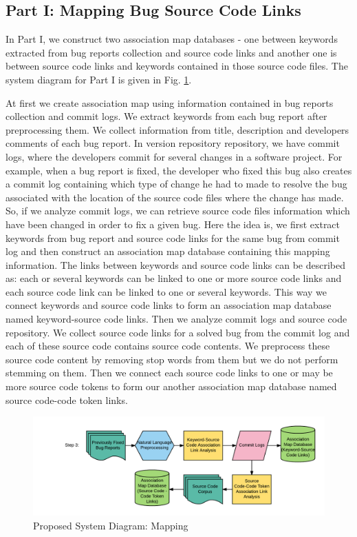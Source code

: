 \documentclass{sig-alternate}
\begin{document}
\subsection{Part I: Mapping Bug Source Code Links}
In Part I, we construct two association map databases -  one between keywords extracted from bug reports collection and source code links and another one is between source code links and keywords contained in those source code files. The system diagram for Part I is given in Fig. \ref{fig:MP}.

At first we create association map using information contained in bug reports collection and commit logs. We extract keywords from each bug report after preprocessing them. We collect information from title, description and developers comments of each bug report.
In version repository repository, we have commit logs, where the developers commit for several changes in a software project. For example, when a bug report is fixed, the developer who fixed this bug also creates a commit log containing which type of change he had to made to resolve the bug associated with the location of the source code files where the change has made. So, if we analyze commit logs, we can retrieve source code files information which have been changed in order to fix a given bug. Here the idea is, we first extract keywords from bug report and source code links for the same bug from commit log and then construct an association map database containing this mapping information. The links between keywords and source code links can be described as: each or several keywords can be linked to one or more source code links and each source code link can be linked to one or several keywords. This way we connect keywords and source code links to form an association map database named keyword-source code links.  Then we analyze commit logs and source code repository. We collect source code links for a solved bug from the commit log and each of these source code contains source code contents. We preprocess these source code content by removing stop words from them but we do not perform stemming on them. Then we connect each source code links to one or may be more source code tokens to form our another association map database named source code-code token links.
\begin{figure}
\centering
\includegraphics[scale=0.75]{Mapping}
\caption{Proposed System Diagram: Mapping}
\label{fig:MP}
\end{figure}
\end{document}
